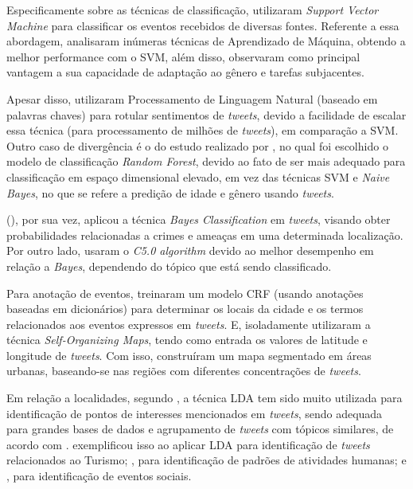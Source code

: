 \documentclass[
	12pt,				%
	oneside,			%
	a4paper,			%
	english,			%
	brazil				%
	]{abntex2ppgsi}
\begin{document}
{{Especificamente sobre as técnicas de classificação, \cite{Mukherjee2015} utilizaram \textit{Support Vector Machine} para classificar os eventos recebidos de diversas fontes. Referente a essa abordagem, \cite{Gal-Tzur2014} analisaram inúmeras técnicas de Aprendizado de Máquina, obtendo a melhor performance com o SVM, além disso, observaram como principal vantagem a sua capacidade de adaptação ao gênero e tarefas subjacentes. 

Apesar disso, \cite{Guo2016} utilizaram Processamento de Linguagem Natural (baseado em palavras chaves) para rotular sentimentos de \textit{tweets}, devido a facilidade de escalar essa técnica (para processamento de milhões de \textit{tweets}), em comparação a SVM. Outro caso de divergência é o do estudo realizado por \cite{Farseev2015}, no qual foi escolhido o modelo de classificação \textit{Random Forest}, devido ao fato de ser mais adequado para classificação em espaço dimensional elevado, em vez das técnicas SVM e \textit{Naive Bayes}, no que se refere a predição de idade e gênero usando \textit{tweets}.

\citeauthor{Mata2015} (\citeyear{Mata2015}), por sua vez, aplicou a técnica \textit{Bayes Classification} em \textit{tweets}, visando obter probabilidades relacionadas a crimes e ameaças em uma determinada localização. Por outro lado, \cite{Zagal2016} usaram o \textit{C5.0 algorithm} devido ao melhor desempenho em relação a \textit{Bayes}, dependendo do tópico que está sendo classificado. 

Para anotação de eventos, \cite{Anantharam2015} treinaram um modelo CRF (usando anotações baseadas em dicionários) para determinar os locais da cidade e os termos relacionados aos eventos expressos em \textit{tweets}. E, isoladamente \cite{Frias-Martinez2014} utilizaram a técnica \textit{Self-Organizing Maps}, tendo como entrada os valores de latitude e longitude de \textit{tweets}. Com isso, construíram um mapa segmentado em áreas urbanas, baseando-se nas regiões com diferentes concentrações de \textit{tweets}.

Em relação a localidades, segundo \cite{Farseev2015}, a técnica LDA tem sido muito utilizada para identificação de pontos de interesses mencionados em \textit{tweets}, sendo adequada para grandes bases de dados e agrupamento de \textit{tweets} com tópicos similares, de acordo com \cite{Steiger2015Census}. \cite{Abbasi2015} exemplificou isso ao aplicar LDA para identificação de \textit{tweets} relacionados ao Turismo; \cite{Hasan2014}, para identificação de padrões de atividades humanas; e \cite{DiLorenzo2013}, para identificação de eventos sociais.

}}
\end{document}
